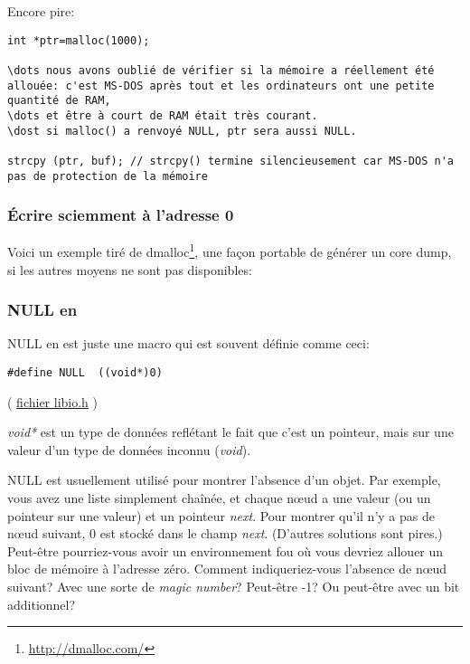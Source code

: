 Encore pire:

\begin{lstlisting}[style=customc]
int *ptr=malloc(1000);

\dots nous avons oublié de vérifier si la mémoire a réellement été allouée: c'est MS-DOS après tout et les ordinateurs ont une petite quantité de RAM,
\dots et être à court de RAM était très courant.
\dost si malloc() a renvoyé NULL, ptr sera aussi NULL.

strcpy (ptr, buf); // strcpy() termine silencieusement car MS-DOS n'a pas de protection de la mémoire
\end{lstlisting}

\subsubsection{Écrire sciemment à l'adresse 0}
\label{dmalloc_KILL_PROCESS}

Voici un exemple tiré de dmalloc\footnote{\url{http://dmalloc.com/}},
une façon portable de générer un core dump, si les autres moyens ne sont pas disponibles:



\subsubsection{NULL en \CCpp}

NULL en \CCpp est juste une macro qui est souvent définie comme ceci:

\begin{lstlisting}[style=customc]
#define NULL  ((void*)0)
\end{lstlisting}
( \href{https://github.com/wzhy90/linaro_toolchains/blob/8ff8ae680bac04558d10cc9626e12c4c2f6c1348/arm-cortex_a15-linux-gnueabihf/libc/usr/include/libio.h#L70}{fichier libio.h} )

\emph{void*} est un type de données reflétant le fait que c'est un pointeur, mais sur
une valeur d'un type de données inconnu (\emph{void}).

NULL est usuellement utilisé pour montrer l'absence d'un objet.
Par exemple, vous avez une liste simplement chaînée, et chaque n\oe{}ud a une valeur
(ou un pointeur sur une valeur) et un pointeur \emph{next}.
Pour montrer qu'il n'y a pas de n\oe{}ud suivant, 0 est stocké dans le champ \emph{next}.
(D'autres solutions sont pires.)
Peut-être pourriez-vous avoir un environnement fou où vous devriez allouer un bloc
de mémoire à l'adresse zéro. Comment indiqueriez-vous l'absence de n\oe{}ud suivant?
Avec une sorte de \emph{magic number}? Peut-être -1? Ou peut-être avec un bit additionnel?

